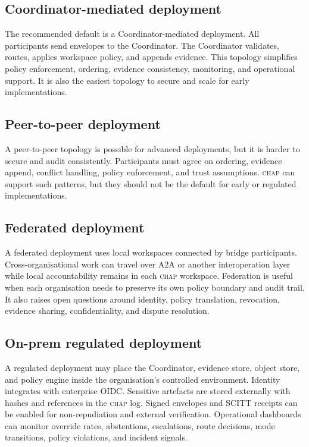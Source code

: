 \documentclass[11pt]{article}
\newcommand{\chap}{\textsc{chap}}
\begin{document}
\subsection{Coordinator-mediated deployment}

The recommended default is a Coordinator-mediated deployment. All participants send envelopes to the Coordinator. The Coordinator validates, routes, applies workspace policy, and appends evidence. This topology simplifies policy enforcement, ordering, evidence consistency, monitoring, and operational support. It is also the easiest topology to secure and scale for early implementations.

\subsection{Peer-to-peer deployment}

A peer-to-peer topology is possible for advanced deployments, but it is harder to secure and audit consistently. Participants must agree on ordering, evidence append, conflict handling, policy enforcement, and trust assumptions. \chap{} can support such patterns, but they should not be the default for early or regulated implementations.

\subsection{Federated deployment}

A federated deployment uses local workspaces connected by bridge participants. Cross-organisational work can travel over A2A or another interoperation layer while local accountability remains in each \chap{} workspace. Federation is useful when each organisation needs to preserve its own policy boundary and audit trail. It also raises open questions around identity, policy translation, revocation, evidence sharing, confidentiality, and dispute resolution.

\subsection{On-prem regulated deployment}

A regulated deployment may place the Coordinator, evidence store, object store, and policy engine inside the organisation's controlled environment. Identity integrates with enterprise OIDC. Sensitive artefacts are stored externally with hashes and references in the \chap{} log. Signed envelopes and SCITT receipts can be enabled for non-repudiation and external verification. Operational dashboards can monitor override rates, abstentions, escalations, route decisions, mode transitions, policy violations, and incident signals.
\end{document}
